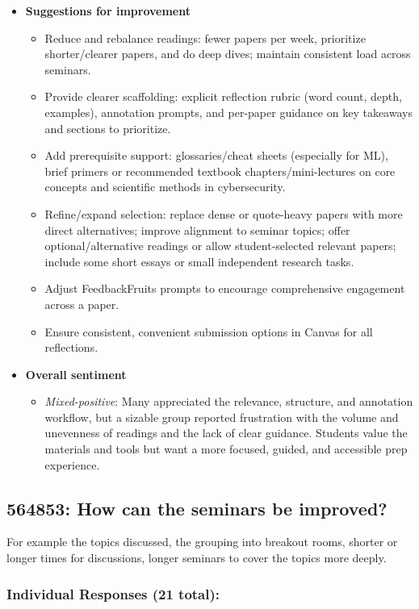 \documentclass[a4paper]{report}
\begin{document}
\begin{itemize}
\item \textbf{Suggestions for improvement}
  \begin{itemize}
    \item Reduce and rebalance readings: fewer papers per week, prioritize shorter/clearer papers, and do deep dives; maintain consistent load across seminars.
    \item Provide clearer scaffolding: explicit reflection rubric (word count, depth, examples), annotation prompts, and per-paper guidance on key takeaways and sections to prioritize.
    \item Add prerequisite support: glossaries/cheat sheets (especially for ML), brief primers or recommended textbook chapters/mini-lectures on core concepts and scientific methods in cybersecurity.
    \item Refine/expand selection: replace dense or quote-heavy papers with more direct alternatives; improve alignment to seminar topics; offer optional/alternative readings or allow student-selected relevant papers; include some short essays or small independent research tasks.
    \item Adjust FeedbackFruits prompts to encourage comprehensive engagement across a paper.
    \item Ensure consistent, convenient submission options in Canvas for all reflections.
  \end{itemize}

\item \textbf{Overall sentiment}
  \begin{itemize}
    \item \textit{Mixed-positive}: Many appreciated the relevance, structure, and annotation workflow, but a sizable group reported frustration with the volume and unevenness of readings and the lack of clear guidance. Students value the materials and tools but want a more focused, guided, and accessible prep experience.
  \end{itemize}
\end{itemize}

\subsection{564853: How can the seminars be improved?}

For example the topics discussed, the grouping into breakout rooms, shorter or 
longer times for discussions, longer seminars to cover the topics more deeply.

\subsubsection{Individual Responses (21 total):}
\end{document}

